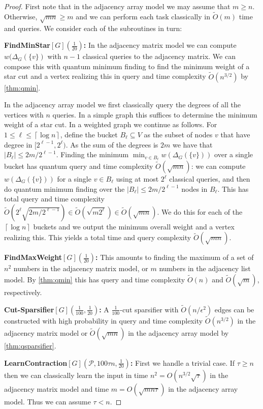 \documentclass[10pt,a4paper]{article}
\newcommand{\Pcal}{\mathcal{P}}
\newcommand{\ceil}[1]{\left\lceil #1 \right\rceil}
\newcommand{\tO}{\tilde O}
\newcommand{\1}{\mathbf{1}}
\theoremstyle{definition}
\begin{document}
\begin{proof}
First note that in the adjacency array model we may assume that $m \ge n$. Otherwise, $\sqrt{mn} \ge m$ and we can perform each task classically in $\tO(m)$ time and queries.
We consider each of the subroutines in turn:

\textbf{FindMinStar$[G](\frac{1}{20})$:} In the adjacency matrix model we can compute $w(\Delta_G(\{v\})$ with $n-1$ classical queries to the adjacency matrix.  
We can compose this with quantum minimum finding to find the minimum weight of a star cut and a vertex realizing this in query and time complexity $\tO(n^{3/2})$ by \cref{thm:qmin}.

In the adjacency array model we first classically query the degrees of all the vertices with $n$ queries.  In a simple graph this suffices to determine the minimum weight of a star cut.
In a weighted graph we continue as follows.  For $1 \leq \ell \leq \ceil{\log n}$, define the bucket $B_\ell \subseteq V$ as the subset of nodes $v$ that have degree in $[2^{\ell-1}, 2^\ell)$.
As the sum of the degrees is $2m$ we have that $|B_\ell| \leq 2m/2^{\ell-1}$.
Finding the minimum $\min_{v \in B_\ell} w(\Delta_G(\{v\}))$ over a single bucket has quantum query and time complexity $\tO(\sqrt{mn})$: we can compute $w(\Delta_G(\{v\}))$ for a single $v \in B_\ell$ using at most $2^\ell$ classical queries, and 
then do quantum minimum finding over the $|B_\ell| \leq 2m/2^{\ell-1}$ nodes in $B_\ell$.
This has total query and time complexity $\tO(2^\ell \sqrt{2m/2^{\ell-1}}) \in \tO(\sqrt{m 2^\ell}) \in \tO(\sqrt{mn})$.
We do this for each of the $\ceil{\log n}$ buckets and we output the minimum overall weight and a vertex realizing this.
This yields a total time and query complexity $\tO(\sqrt{mn})$.

\textbf{FindMaxWeight$[G](\frac{1}{20})$:}
This amounts to finding the maximum of a set of $n^2$ numbers in the adjacency matrix model, or $m$ numbers in the adjacency list model.
By \cref{thm:qmin} this has query and time complexity $\tO(n)$ and $\tO(\sqrt{m})$, respectively.

\textbf{Cut-Sparsifier$[G](\frac{1}{100}, \frac{1}{20})$:} A $\frac{1}{100}$-cut sparsifier with $\tO(n/\epsilon^2)$ edges can be constructed with high probability in query and time complexity $\tilde O(n^{3/2})$ in the adjacency matrix model or $\tilde O(\sqrt{mn})$ in the adjacency array model by \cref{thm:qsparsifier}.  

\textbf{LearnContraction$[G](\Pcal, 100\tau n, \frac{1}{20})$:} 
First we handle a trivial case.  If $\tau \ge n$ then we can classically learn the input in time $n^2 = O(n^{3/2}\sqrt{\tau})$ in the adjacency matrix model and 
time $m = O(\sqrt{mn\tau})$ in the adjacency array model.  Thus we can assume $\tau < n$.  


\end{proof}
\end{document}
